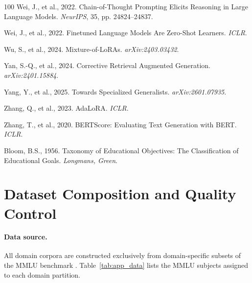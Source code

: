 \documentclass[a4paper,fleql]{cas-sc}
\begin{document}
\begin{thebibliography}{100}
Wei, J., et al., 2022. Chain-of-Thought Prompting Elicits Reasoning in Large Language Models. \textit{NeurIPS}, 35, pp. 24824--24837.

Wei, J., et al., 2022. Finetuned Language Models Are Zero-Shot Learners. \textit{ICLR}.

Wu, S., et al., 2024. Mixture-of-LoRAs. \textit{arXiv:2403.03432}.

Yan, S.-Q., et al., 2024. Corrective Retrieval Augmented Generation. \textit{arXiv:2401.15884}.

Yang, Y., et al., 2025. Towards Specialized Generalists. \textit{arXiv:2601.07935}.

Zhang, Q., et al., 2023. AdaLoRA. \textit{ICLR}.

Zhang, T., et al., 2020. BERTScore: Evaluating Text Generation with BERT. \textit{ICLR}.

Bloom, B.S., 1956. Taxonomy of Educational Objectives: The Classification of Educational Goals. \textit{Longmans, Green}.

\end{thebibliography}

\clearpage
\appendix

\section{Dataset Composition and Quality Control}
\label{app:dataset}

\paragraph{Data source.}
All domain corpora are constructed exclusively from domain-specific subsets of
the MMLU benchmark \citep{hendrycks2021mmlu}. Table~\ref{tab:app_data} lists
the MMLU subjects assigned to each domain partition.
\end{document}
